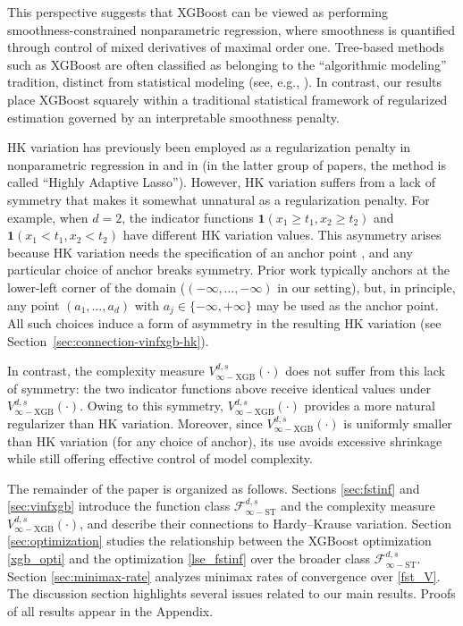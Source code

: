 \documentclass[10pt]{article}
\newcommand{\fstinf}{{\mathcal{F}^{d, s}_{\infty-\text{ST}}}}
\newcommand{\vinfxgb}{{V^{d, s}_{\infty-\text{XGB}}}}
\newcommand{\ind}{{\mathbf{1}}}
\begin{document}
This perspective suggests that XGBoost can be viewed as performing
smoothness-constrained nonparametric regression, where smoothness is
quantified through control of mixed derivatives of maximal order one. 
Tree-based methods such as XGBoost are often classified as belonging
to the ``algorithmic modeling'' tradition, distinct from statistical
modeling (see, e.g., \citet{breiman2001statistical}). In contrast, 
our results place XGBoost squarely within a traditional statistical 
framework of regularized estimation governed by an interpretable 
smoothness penalty. 

HK variation has previously been employed as a
regularization penalty in nonparametric regression in
\citet{fang2021multivariate} and in \citet{benkeser2016highly,
van2023efficient, schuler2022lassoed} (in the latter group of papers, 
the method is called ``Highly Adaptive Lasso''). However, HK variation 
suffers from a lack of symmetry that makes it somewhat unnatural as a 
regularization penalty. For example, when $d = 2$, the indicator 
functions $\ind(x_1 \ge t_1, x_2 \ge t_2)$ and 
$\ind(x_1 < t_1, x_2 < t_2)$ have different HK variation values. This 
asymmetry arises because HK variation needs the specification of 
an anchor point \cite{aistleitner2015functions, 
owen2005multidimensional}, and any particular choice of anchor breaks 
symmetry. Prior work \cite{fang2021multivariate, benkeser2016highly} 
typically anchors at the lower-left corner of the domain 
($(-\infty, \dots, -\infty)$ in our setting), but, in principle, any 
point $(a_1, \dots, a_d)$ with $a_j \in \{-\infty, +\infty\}$ may be 
used as the anchor point. All such choices induce a form of 
asymmetry in the resulting HK variation (see 
Section~\ref{sec:connection-vinfxgb-hk}).

In contrast, the complexity measure $\vinfxgb(\cdot)$ does not suffer
from this lack of symmetry: the two indicator functions above receive
identical values under $\vinfxgb(\cdot)$. Owing to this symmetry,
$\vinfxgb(\cdot)$ provides a more natural regularizer than HK
variation. Moreover, since $\vinfxgb(\cdot)$ is uniformly smaller than
HK variation (for any choice of anchor), its use avoids excessive
shrinkage while still offering effective control of model complexity. 

The remainder of the paper is organized as follows. 
Sections \ref{sec:fstinf} and \ref{sec:vinfxgb} introduce the 
function class $\fstinf$ and the complexity measure 
$\vinfxgb(\cdot)$, and describe their connections to Hardy–Krause 
variation. Section \ref{sec:optimization} studies the relationship 
between the XGBoost optimization \eqref{xgb_opti} and the 
optimization \eqref{lse_fstinf} over the broader class $\fstinf$. 
Section \ref{sec:minimax-rate} analyzes minimax rates of 
convergence over \eqref{fst_V}. The discussion section highlights 
several issues related to our main results. Proofs of all results 
appear in the Appendix.
\end{document}
